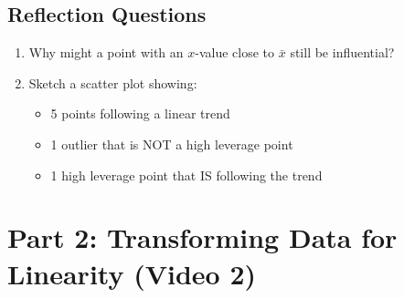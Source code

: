 \documentclass[11pt]{article}
\begin{document}
\subsection*{Reflection Questions}
\begin{enumerate}[resume, label=\arabic*.]
\item Why might a point with an $x$-value close to $\bar{x}$ still be influential?

\vspace{1.5em}

\item Sketch a scatter plot showing:
\begin{itemize}
\item 5 points following a linear trend
\item 1 outlier that is NOT a high leverage point
\item 1 high leverage point that IS following the trend
\end{itemize}

\begin{center}
\end{center}
\end{enumerate}

\newpage

\section*{Part 2: Transforming Data for Linearity (Video 2)}
\end{document}
